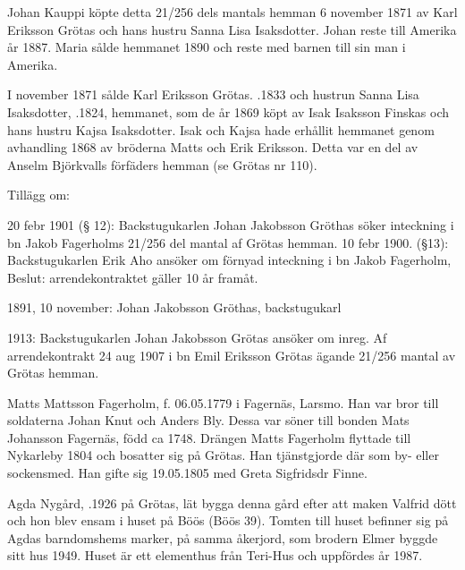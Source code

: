 Johan Kauppi köpte detta 21/256 dels mantals hemman 6 november 1871 av Karl Eriksson Grötas och hans hustru Sanna Lisa Isaksdotter. Johan reste till Amerika år 1887. Maria sålde hemmanet 1890 och reste med barnen till sin man i Amerika.


I november 1871 sålde Karl Eriksson Grötas. .1833 och hustrun Sanna Lisa Isaksdotter, .1824, hemmanet, som de år 1869 köpt av Isak Isaksson Finskas och hans hustru Kajsa Isaksdotter. Isak och Kajsa hade erhållit hemmanet genom avhandling 1868 av bröderna Matts och Erik Eriksson. Detta var en del av Anselm Björkvalls förfäders hemman (se Grötas nr 110).



Tillägg om:

20 febr 1901 (§ 12): Backstugukarlen Johan Jakobsson Gröthas söker inteckning i bn Jakob Fagerholms 21/256 del mantal af Grötas hemman. 10 febr 1900. (§13): Backstugukarlen Erik Aho ansöker om förnyad inteckning i bn Jakob Fagerholm, Beslut: arrendekontraktet gäller 10 år framåt.

1891, 10 november: Johan Jakobsson Gröthas, backstugukarl

1913: Backstugukarlen Johan Jakobsson Grötas ansöker om inreg. Af arrendekontrakt 24 aug 1907 i bn Emil Eriksson Grötas ägande 21/256 mantal av Grötas hemman.

Matts Mattsson Fagerholm, f. 06.05.1779 i Fagernäs, Larsmo. Han var bror till soldaterna Johan Knut och Anders Bly. Dessa var söner till bonden Mats Johansson Fagernäs, född ca 1748.
Drängen Matts Fagerholm flyttade till Nykarleby 1804 och bosatter sig på Grötas. Han tjänstgjorde där som by- eller sockensmed. Han gifte sig 19.05.1805 med Greta Sigfridsdr Finne.






Agda Nygård, .1926 på Grötas, lät bygga denna gård efter att maken Valfrid dött och hon blev ensam i huset på Böös (Böös 39). Tomten till huset befinner sig på Agdas barndomshems marker, på samma åkerjord, som brodern Elmer byggde sitt hus 1949. Huset är ett elementhus från Teri-Hus och uppfördes år 1987.





